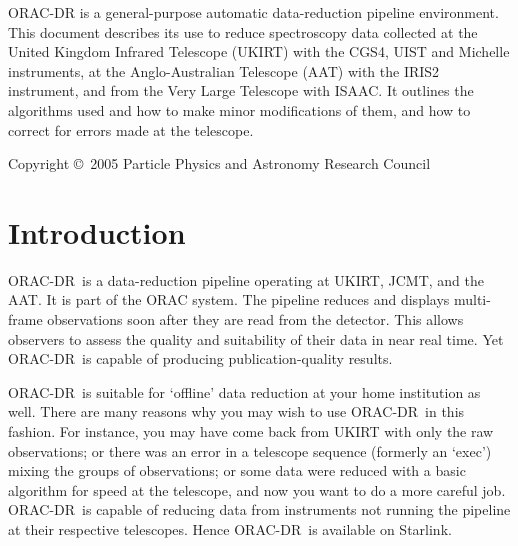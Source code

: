 \documentclass[twoside,11pt]{article}
\newcommand{\stardocinitials}  {SUN}
\newcommand{\stardoccopyright} {Copyright \copyright\ 2005 Particle Physics and Astronomy Research Council}
\newcommand{\stardocnumber}    {236.5}
\newcommand{\stardocabstract}  {{\footnotesize ORAC-DR} is a
general-purpose automatic data-reduction pipeline environment.  This
document describes its use to reduce spectroscopy data collected at the
United Kingdom Infrared Telescope (UKIRT) with the CGS4, UIST and Michelle
instruments, at the Anglo-Australian Telescope (AAT) with the IRIS2
instrument, and from the Very Large Telescope with ISAAC. It outlines the
algorithms used and how to make minor modifications of them, and how
to correct for errors made at the telescope.}
\newcommand{\stardocname}{\stardocinitials /\stardocnumber}
\newcommand{\htmladdnormallink}[2]{#1}
\newenvironment{latexonly}{}{}
\newcommand{\xlabel}[1]{}
\renewcommand{\_}{\texttt{\symbol{95}}}
\newcommand{\ORACDR}{{\footnotesize ORAC-DR}}
\newcommand{\AAT}{\htmladdnormallink{AAT}{http://www.aao.gov.au/}}
\newcommand{\JCMT}{\htmladdnormallink{JCMT}{http://www.jach.hawaii.edu/JACpublic/JCMT/}}
\newcommand{\UKIRT}{\htmladdnormallink{UKIRT}{http://www.jach.hawaii.edu/JACpublic/UKIRT/}}
\renewcommand{\thepage}{\roman{page}}
\begin{document}
\stardocabstract

\begin{latexonly}
\newpage
\vspace*{\fill}
\stardoccopyright
\end{latexonly}

  \newpage
  \begin{latexonly}
    \setlength{\parskip}{0mm}
    \tableofcontents
    \setlength{\parskip}{\medskipamount}
    \markboth{\stardocname}{\stardocname}
  \end{latexonly}

\cleardoublepage
\renewcommand{\thepage}{\arabic{page}}
\setcounter{page}{1}


\section{\xlabel{introduction}Introduction\label{introduction}}

\ORACDR\ is a data-reduction pipeline operating at \UKIRT, \JCMT, and
the \AAT. It is part of the \htmladdnormallink{ORAC system}{http://www.stsci.edu/stsci/meetings/adassVII/bridgera.html}.
The pipeline reduces and displays multi-frame observations soon after
they are read from the detector. This allows observers to assess the
quality and suitability of their data in near real time. Yet \ORACDR\
is capable of producing publication-quality results.

\ORACDR\ is suitable for `offline' data reduction at your home
institution as well. There are many reasons why you may wish to use
\ORACDR\ in this fashion. For instance, you may have come back from
UKIRT with only the raw observations; or there was an error in a
telescope sequence (formerly an `exec') mixing the groups of
observations; or some data were reduced with a basic algorithm for
speed at the telescope, and now you want to do a more careful job.
\ORACDR\ is capable of reducing data from instruments not running
the pipeline at their respective telescopes. Hence \ORACDR\ is
available on Starlink.
\end{document}
